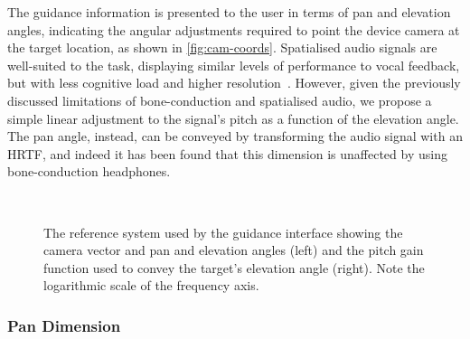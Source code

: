 \documentclass{article}
\begin{document}
The guidance information is presented to the user in terms of pan and elevation angles, indicating the angular adjustments required to point the device camera at the target location, as shown in \cref{fig:cam-coords}.
Spatialised audio signals are well-suited to the task, displaying similar levels of performance to vocal feedback, but with less cognitive load and higher resolution~\cite{klatzky2006cognitive}.
However, given the previously discussed limitations of bone-conduction and spatialised audio, we propose a simple linear adjustment to the signal's pitch as a function of the elevation angle. 
The pan angle, instead, can be conveyed by transforming the audio signal with an HRTF, and indeed it has been found that this dimension is unaffected by using bone-conduction headphones\cite{schonstein2008comparison,macdonald2006spatial,stanley2006lateralization}. 

\begin{figure}[t]
  \centering
~
  \caption{The reference system used by the guidance interface showing the camera vector and pan and elevation angles (left) and the pitch gain function used to convey the target's elevation angle (right). Note the logarithmic scale of the frequency axis.}
\end{figure}

\subsubsection{Pan Dimension}
\end{document}
